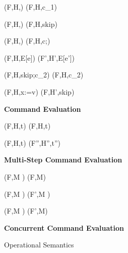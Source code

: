 \begin{figure*}
\begin{minipage}[t]{0.5\linewidth}
{(F,H,) \rightarrow (F,H,c_1)}
\vspace{8pt}

\infrule[C-WhileFalse]
{}
{(F,H,) \rightarrow (F,H,skip)}
\vspace{8pt}

{(F,H,) \rightarrow (F,H,c;)}
\end{minipage}
\hfill
\begin{minipage}[t]{0.5\linewidth}
{(F,H,E[e])  (F',H',E[e'])}
\vspace{22pt}

\infrule[C-SkipSeq]
{}
{(F,H,skip;c_2) \rightarrow (F,H,c_2)}
\vspace{22pt}

{(F,H,x:=v) \rightarrow (F,H',skip)}
\end{minipage}
\centerline{\textbf{Command Evaluation}}

\begin{minipage}[t]{0.5\linewidth}
\infrule[T-Refl]
{}
{(F,H,t)  \opsteps{[]} (F,H,t)}
\vspace{18pt}

{(F,H,t)  (F'',H'',t'')}
\centerline{\textbf{Multi-Step Command Evaluation}}
\end{minipage}
\hfill
\begin{minipage}[t]{0.5\linewidth}
\infrule[M-skip]
{}
{(F,M \uplus {}) \rightarrow (F,M)}
\vspace{8pt}

{(F,M \uplus {}) \rightarrow (F',M \uplus {})}
\vspace{8pt}

{(F,M \uplus {}) \rightarrow (F',M)} %
\centerline{\textbf{Concurrent Command Evaluation}}
\end{minipage}

\caption{Operational Semantics}
\end{figure*}

